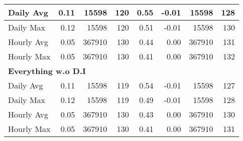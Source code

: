 \begin{tabular}{l|r|r|r|r|r|r|r}
\hline
\hspace{1em}Daily Avg & 0.11 & 15598 & 120 & 0.55 & -0.01 & 15598 & 128\\
\hline
\hspace{1em}Daily Max & 0.12 & 15598 & 120 & 0.51 & -0.01 & 15598 & 130\\
\hline
\hspace{1em}Hourly Avg & 0.05 & 367910 & 130 & 0.44 & 0.00 & 367910 & 131\\
\hline
\hspace{1em}Hourly Max & 0.05 & 367910 & 130 & 0.41 & 0.00 & 367910 & 132\\
\hline
\multicolumn{8}{l}{\textbf{Everything w.o D.I}}\\
\hline
\hspace{1em}Daily Avg & 0.11 & 15598 & 119 & 0.54 & -0.01 & 15598 & 127\\
\hline
\hspace{1em}Daily Max & 0.12 & 15598 & 119 & 0.49 & -0.01 & 15598 & 128\\
\hline
\hspace{1em}Hourly Avg & 0.05 & 367910 & 130 & 0.43 & 0.00 & 367910 & 130\\
\hline
\hspace{1em}Hourly Max & 0.05 & 367910 & 130 & 0.41 & 0.00 & 367910 & 131\\
\hline
\end{tabular}
